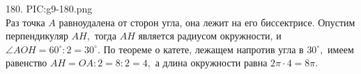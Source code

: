 180. {{PIC:g9-180.png}}\\
Раз точка $A$ равноудалена от сторон угла, она лежит на его биссектрисе. Опустим перпендикуляр $AH,$ тогда $AH$ является радиусом окружности, и $\angle AOH=60^\circ:2=30^\circ.$ По теореме о катете, лежащем напротив угла в $30^\circ,$ имеем равенство $AH=OA:2=8:2=4,$ а длина окружности равна $2\pi\cdot4=8\pi.$\newpage\noindent
